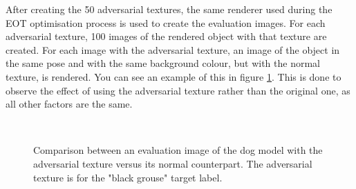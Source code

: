 After creating the 50 adversarial textures, the same renderer used during the EOT optimisation process is used to create the evaluation images. For each adversarial texture, 100 images of the rendered object with that texture are created. For each image with the adversarial texture, an image of the object in the same pose and with the same background colour, but with the normal texture, is rendered. You can see an example of this in figure \ref{fig:evaluation_images_comparison}. This is done to observe the effect of using the adversarial texture rather than the original one, as all other factors are the same.

\begin{figure}[H]
\centering
{}~ %
\\ %

\caption[Comparison between equivalent adversarial and normal images for evaluation.]{Comparison between an evaluation image of the dog model with the adversarial texture versus its normal counterpart. The adversarial texture is for the "black grouse" target label.}
\label{fig:evaluation_images_comparison}
\end{figure}

